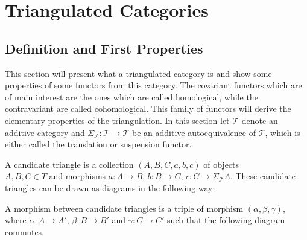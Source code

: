 \chapter{Triangulated Categories}

\section{Definition and First Properties}
    This section will present what a triangulated category is and show some properties of some functors from this category. The covariant functors which are of main interest are the ones which are called homological, while the contravariant are called cohomological. This family of functors will derive the elementary properties of the triangulation. In this section let $\mathcal{T}$ denote an additive category and $\Sigma_{\mathcal{T}}:\mathcal{T}\rightarrow\mathcal{T}$ be an additive autoequivalence of $\mathcal{T}$, which is either called the translation or suspension functor.
    
    \begin{definition}
        A candidate triangle is a collection $(A,B,C,a,b,c)$ of objects \\ $A,B,C\in T$ and morphisms $a:A\rightarrow B$, $b:B\rightarrow C$, $c:C\rightarrow \Sigma_{\mathcal{T}}A$. These candidate triangles can be drawn as diagrams in the following way:

        \begin{center}
        \end{center}

        A morphism between candidate triangles is a triple of morphism $(\alpha, \beta, \gamma)$, where $\alpha : A \rightarrow A'$, $\beta : B \rightarrow B'$ and $\gamma : C \rightarrow C'$ such that the following diagram commutes.

    \begin{center}
    \end{center}

    \end{definition}

